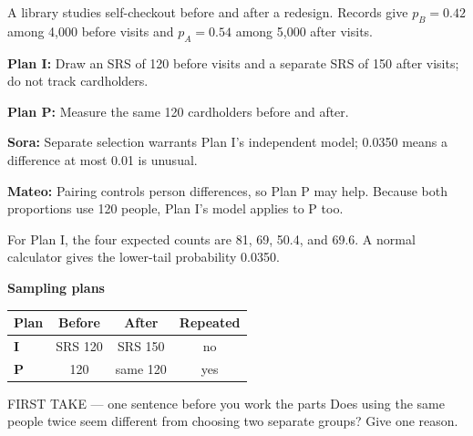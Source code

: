 \documentclass[14pt]{extarticle}
\begin{document}
\pagestyle{empty}


\noindent\begin{minipage}[t]{0.57\linewidth}
\vspace{0pt}
A library studies self-checkout before and after a redesign. Records give $p_B=0.42$ among 4{,}000 before visits and $p_A=0.54$ among 5{,}000 after visits.\par\smallskip \textbf{Plan I:} Draw an SRS of 120 before visits and a separate SRS of 150 after visits; do not track cardholders.\par \textbf{Plan P:} Measure the same 120 cardholders before and after.\par\smallskip \textbf{Sora:} Separate selection warrants Plan I's independent model; 0.0350 means a difference at most 0.01 is unusual.\par \textbf{Mateo:} Pairing controls person differences, so Plan P may help. Because both proportions use 120 people, Plan I's model applies to P too.\par\smallskip For Plan I, the four expected counts are 81, 69, 50.4, and 69.6. A normal calculator gives the lower-tail probability 0.0350.\par
\end{minipage}\hfill
\begin{minipage}[t]{0.40\linewidth}
\vspace{0pt}
\begin{center}
\textbf{Sampling plans}\par\smallskip
\begin{tabular}{|l|c|c|c|}
\hline
\textbf{Plan} & \textbf{Before} & \textbf{After} & \textbf{Repeated} \\ \hline
\textbf{I} & SRS 120 & SRS 150 & no \\ \hline
\textbf{P} & 120 & same 120 & yes \\ \hline
\end{tabular}
\end{center}
\end{minipage}

\begin{firsttakebox}{FIRST TAKE --- one sentence before you work the parts}
Does using the same people twice seem different from choosing two separate groups? Give one reason.
\end{firsttakebox}
\end{document}
